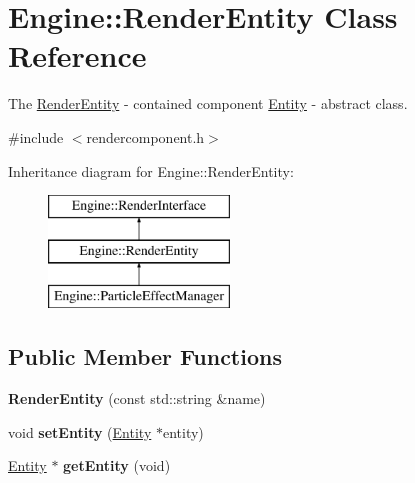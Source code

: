 \hypertarget{classEngine_1_1RenderEntity}{}\section{Engine\+:\+:Render\+Entity Class Reference}
\label{classEngine_1_1RenderEntity}


The \hyperlink{classEngine_1_1RenderEntity}{Render\+Entity} -\/ contained component \hyperlink{classEngine_1_1Entity}{Entity} -\/ abstract class.  




{\ttfamily \#include $<$rendercomponent.\+h$>$}

Inheritance diagram for Engine\+:\+:Render\+Entity\+:\begin{figure}[H]
\begin{center}
\leavevmode
\includegraphics[height=3.000000cm]{classEngine_1_1RenderEntity}
\end{center}
\end{figure}
\subsection*{Public Member Functions}
\begin{DoxyCompactItemize}
\item 
\hypertarget{classEngine_1_1RenderEntity_a6db47242e2ed9f991b121f493db87f61}{}{\bfseries Render\+Entity} (const std\+::string \&name)\label{classEngine_1_1RenderEntity_a6db47242e2ed9f991b121f493db87f61}

\item 
\hypertarget{classEngine_1_1RenderEntity_a6a2857cacc97308800424731135df39d}{}void {\bfseries set\+Entity} (\hyperlink{classEngine_1_1Entity}{Entity} $\ast$entity)\label{classEngine_1_1RenderEntity_a6a2857cacc97308800424731135df39d}

\item 
\hypertarget{classEngine_1_1RenderEntity_af3aaf91fa4075bdd490e809650d06579}{}\hyperlink{classEngine_1_1Entity}{Entity} $\ast$ {\bfseries get\+Entity} (void)\label{classEngine_1_1RenderEntity_af3aaf91fa4075bdd490e809650d06579}

\end{DoxyCompactItemize}
